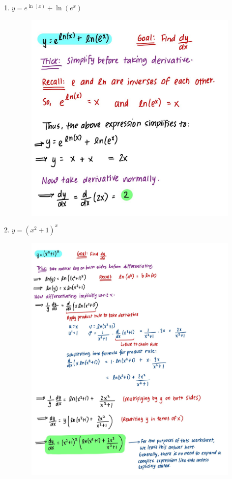 \documentclass{article}
\begin{document}
\begin{enumerate}
\begin{figure}[H]
        \label{fig:Q1.2}
    \end{figure}
    \item $y = e^{\ln(x)} + \ln(e^x)$
    \begin{figure}[H]
        \centering
        \includegraphics[width=0.55\linewidth]{Q1.5.jpg}
        \label{fig:Q1.5}
    \end{figure}
    \item $y = (x^2 + 1)^x$
    \begin{figure}[H]
        \centering
        \includegraphics[width=0.9\linewidth]{Q1.3.jpg}
        \label{fig:Q1.3}

\end{figure}
\end{enumerate}
\end{document}
